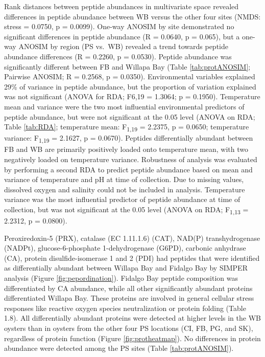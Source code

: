 \documentclass [11pt, proquest] {uwthesis}[2015/03/03]
\begin{document}
Rank distances between peptide abundances in multivariate space revealed differences in peptide abundance between WB versus the other four sites (NMDS: stress = 0.0750, p = 0.0099). One-way ANOSIM by site demonstrated no significant differences in peptide abundance (R = 0.0640, p = 0.065), but a one-way ANOSIM by region (PS vs.~WB) revealed a trend towards peptide abundance differences (R = 0.2260, p = 0.0530). Peptide abundance was significantly different between FB and Willapa Bay (Table \ref{tab:protANOSIM}; Pairwise ANOSIM; R = 0.2568, p = 0.0350). Environmental variables explained 29\% of variance in peptide abundance, but the proportion of variation explained was not significant (ANOVA for RDA; F6,19 = 1.3064; p = 0.1950). Temperature mean and variance were the two most influential environmental predictors of peptide abundance, but were not significant at the 0.05 level (ANOVA on RDA; Table \ref{tab:RDA}; temperature mean: F\textsubscript{1,19} = 2.2375, p = 0.0650; temperature variance: F\textsubscript{1,19} = 2.1627, p = 0.0670). Peptides differentially abundant between FB and WB are primarily positively loaded onto temperature mean, with two negatively loaded on temperature variance. Robustness of analysis was evaluated by performing a second RDA to predict peptide abundance based on mean and variance of temperature and pH at time of collection. Due to missing values, dissolved oxygen and salinity could not be included in analysis. Temperature variance was the most influential predictor of peptide abundance at time of collection, but was not significant at the 0.05 level (ANOVA on RDA; F\textsubscript{1,13} = 2.2312, p = 0.0800).

Peroxiredoxin-5 (PRX), catalase (EC 1.11.1.6) (CAT), NAD(P) transhydrogenase (NADPt), glucose-6-phosphate 1-dehydrogenase (G6PD), carbonic anhydrase (CA), protein disulfide-isomerase 1 and 2 (PDI) had peptides that were identified as differentially abundant between Willapa Bay and Fidalgo Bay by SIMPER analysis (Figure \ref{fig:pepordination}). Fidalgo Bay peptide composition was differentiated by CA abundance, while all other significantly abundant proteins differentiated Willapa Bay. These proteins are involved in general cellular stress responses like reactive oxygen species neutralization or protein folding (Table 1.8). All differentially abundant proteins were detected at higher levels in the WB oysters than in oysters from the other four PS locations (CI, FB, PG, and SK), regardless of protein function (Figure \ref{fig:protheatmap}). No differences in protein abundance were detected among the PS sites (Table \ref{tab:protANOSIM}).
\end{document}
